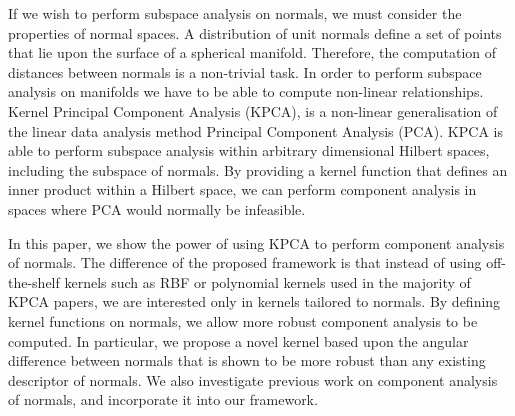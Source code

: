 If we wish to perform subspace analysis on normals, we must consider the
properties of normal spaces. A distribution of unit normals define a set of
points that lie upon the surface of a spherical manifold. Therefore, the
computation of distances between normals is a non-trivial task. In order to
perform subspace analysis on manifolds we have to be able to compute non-linear
relationships.
Kernel Principal Component Analysis (KPCA), is a non-linear generalisation of
the linear data analysis method Principal Component Analysis (PCA). KPCA is able
to perform subspace analysis within arbitrary dimensional Hilbert spaces,
including the subspace of normals. By providing a kernel function that defines
an inner product within a Hilbert space, we can perform component analysis in
spaces where PCA would normally be infeasible.

In this paper, we show the power of using KPCA to perform component analysis of
normals. The difference of the proposed framework is that instead of using off-
the-shelf kernels such as RBF or polynomial kernels used in the majority of KPCA
papers, we are interested only in kernels tailored to normals. By defining
kernel functions on normals, we allow more robust component analysis to be
computed. In particular, we propose a novel kernel based upon the angular
difference between normals that is shown to be more robust than any existing
descriptor of normals. We also investigate previous work on component analysis
of normals, and incorporate it into our framework.

